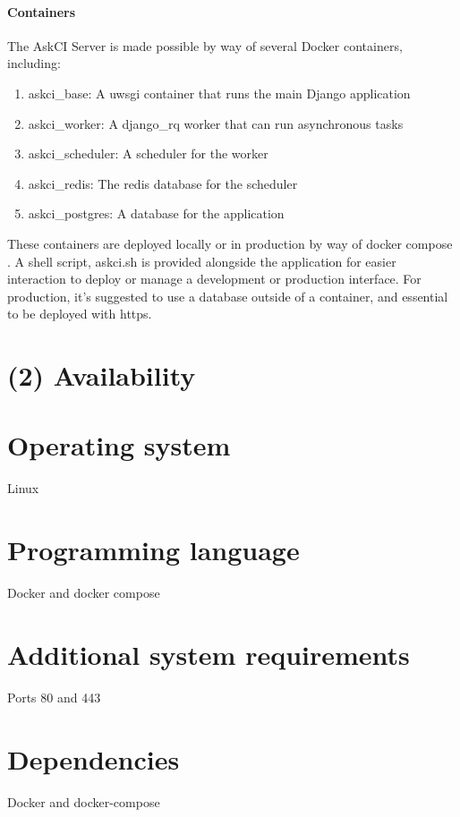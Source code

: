 \documentclass{jors}
\begin{document}
\paragraph{Containers}

The AskCI Server is made possible by way of several Docker \cite{docker} containers, including:

\begin{enumerate}
\item askci\_base: A uwsgi \cite{uwsgi} container that runs the main Django \cite{django} application
 \item askci\_worker: A django\_rq \cite{django-rq} worker that can run asynchronous tasks
 \item askci\_scheduler: A scheduler for the worker
 \item askci\_redis: The redis database for the scheduler
 \item askci\_postgres: A database for the application
\end{enumerate}

These containers are deployed locally or in production by way of docker compose \cite{docker-compose}. A shell script, askci.sh is provided alongside the application for easier interaction to deploy or manage a development or production interface.
For production, it's suggested to use a database outside of a container, and essential to be deployed with https.

\thispagestyle{empty} 
\section*{(2) Availability}
\vspace{0.5cm}
\section*{Operating system}
Linux

\section*{Programming language}
Docker and docker compose

\section*{Additional system requirements}
Ports 80 and 443

\section*{Dependencies}
Docker and docker-compose
\end{document}
